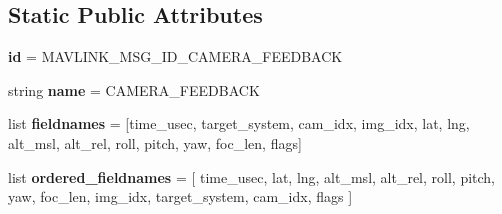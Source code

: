 \subsection*{Static Public Attributes}
\begin{DoxyCompactItemize}
\item 
\mbox{\label{classpymavlink_1_1dialects_1_1v10_1_1MAVLink__camera__feedback__message_ab8f35da6b6d40f6eeec1d76a651db8a4}} 
{\bfseries id} = M\+A\+V\+L\+I\+N\+K\+\_\+\+M\+S\+G\+\_\+\+I\+D\+\_\+\+C\+A\+M\+E\+R\+A\+\_\+\+F\+E\+E\+D\+B\+A\+CK
\item 
\mbox{\label{classpymavlink_1_1dialects_1_1v10_1_1MAVLink__camera__feedback__message_a0a96de2108d7e0254978e176c3d8d5a4}} 
string {\bfseries name} = \textquotesingle{}C\+A\+M\+E\+R\+A\+\_\+\+F\+E\+E\+D\+B\+A\+CK\textquotesingle{}
\item 
\mbox{\label{classpymavlink_1_1dialects_1_1v10_1_1MAVLink__camera__feedback__message_a11fce074aaeb4b0edb221ab7ce664244}} 
list {\bfseries fieldnames} = \mbox{[}\textquotesingle{}time\+\_\+usec\textquotesingle{}, \textquotesingle{}target\+\_\+system\textquotesingle{}, \textquotesingle{}cam\+\_\+idx\textquotesingle{}, \textquotesingle{}img\+\_\+idx\textquotesingle{}, \textquotesingle{}lat\textquotesingle{}, \textquotesingle{}lng\textquotesingle{}, \textquotesingle{}alt\+\_\+msl\textquotesingle{}, \textquotesingle{}alt\+\_\+rel\textquotesingle{}, \textquotesingle{}roll\textquotesingle{}, \textquotesingle{}pitch\textquotesingle{}, \textquotesingle{}yaw\textquotesingle{}, \textquotesingle{}foc\+\_\+len\textquotesingle{}, \textquotesingle{}flags\textquotesingle{}\mbox{]}
\item 
\mbox{\label{classpymavlink_1_1dialects_1_1v10_1_1MAVLink__camera__feedback__message_a86efd8f01643442d484b30dd1114cbe1}} 
list {\bfseries ordered\+\_\+fieldnames} = \mbox{[} \textquotesingle{}time\+\_\+usec\textquotesingle{}, \textquotesingle{}lat\textquotesingle{}, \textquotesingle{}lng\textquotesingle{}, \textquotesingle{}alt\+\_\+msl\textquotesingle{}, \textquotesingle{}alt\+\_\+rel\textquotesingle{}, \textquotesingle{}roll\textquotesingle{}, \textquotesingle{}pitch\textquotesingle{}, \textquotesingle{}yaw\textquotesingle{}, \textquotesingle{}foc\+\_\+len\textquotesingle{}, \textquotesingle{}img\+\_\+idx\textquotesingle{}, \textquotesingle{}target\+\_\+system\textquotesingle{}, \textquotesingle{}cam\+\_\+idx\textquotesingle{}, \textquotesingle{}flags\textquotesingle{} \mbox{]}

\end{DoxyCompactItemize}
